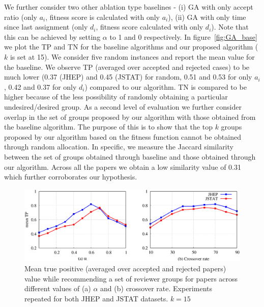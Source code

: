 We further consider two other 
ablation type baselines - (i) GA with only accept ratio (only $a_i$, fitness score is calculated with only $a_i$), (ii) GA with only time since last assignment 
(only $d_i$, fitness score calculated with only $d_i$). Note that this can be achieved by setting $\alpha$ to 1 and 0 respectively. 
In figure~\ref{fig:GA_base} we plot the TP and TN for 
the baseline algorithms and our proposed algorithm ($k$ is set at 15). 
We consider five random instances and report the mean value for the baseline. We observe TP (averaged over accepted and rejected cases) 
to be much lower (0.37 (JHEP) and 0.45 (JSTAT) for random, 0.51 and 0.53 for only $a_i$, 0.42 and 0.37 for only $d_i$) compared to our algorithm. 
 TN is compared to be higher because of the less possibility of randomly obtaining a particular undesired/desired group.  
As a second level of evaluation we further consider overlap in the set of groups proposed by our 
algorithm with those obtained from the baseline algorithm. The purpose of this is to show that the top $k$ groups proposed by our algorithm based on the fitness function cannot be obtained 
through random allocation. In specific, we measure the Jaccard similarity between the set of groups obtained through baseline and those obtained through our algorithm. Across 
all the papers we obtain a low similarity value of 0.31 which further corroborates our hypothesis.\\
\begin{figure}
\centering
\includegraphics[scale = 0.35]{./texfiles/Chapter_4/cikm_17/figures/param_estimate.eps}
\caption{\label{fig:param_estimte} Mean true positive (averaged over accepted and rejected papers) value while recommending a set of reviewer groups for papers across different values 
of (a) $\alpha$ and (b) crossover rate. Experiments repeated for both JHEP and JSTAT datasets. $k = 15$}
\end{figure}


